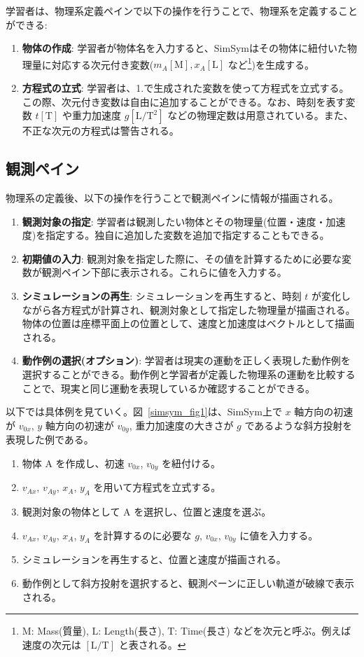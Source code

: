 \documentclass[11pt, a4paper, oneside, twocolumn, dvipdfmx]{jsarticle}
\newcommand{\simname}{SimSym}
\begin{document}
学習者は、物理系定義ペインで以下の操作を行うことで、物理系を定義することができる:

\begin{enumerate}
\item \textbf{物体の作成}: 学習者が物体名を入力すると、\simname はその物体に紐付いた物理量に対応する次元付き変数($m_A\mathrm{[M]}, x_A\mathrm{[L]}$ など\footnote{$\mathrm{M}$: Mass(質量), $\mathrm{L}$: Length(長さ), $\mathrm{T}$: Time(長さ) などを次元と呼ぶ。例えば速度の次元は $\mathrm{[L/T]}$ と表される。})を生成する。
\item \textbf{方程式の立式}: 学習者は、1.で生成された変数を使って方程式を立式する。この際、次元付き変数は自由に追加することができる。なお、時刻を表す変数 $t\mathrm{[T]}$ や重力加速度 $g\mathrm{[L/T^2]}$ などの物理定数は用意されている。また、不正な次元の方程式は警告される。
\end{enumerate}

\subsection*{観測ペイン}

物理系の定義後、以下の操作を行うことで観測ペインに情報が描画される。

\begin{enumerate}[resume]
\item \textbf{観測対象の指定}: 学習者は観測したい物体とその物理量(位置・速度・加速度)を指定する。独自に追加した変数を追加で指定することもできる。
\item \textbf{初期値の入力}: 観測対象を指定した際に、その値を計算するために必要な変数が観測ペイン下部に表示される。これらに値を入力する。
\item \textbf{シミュレーションの再生}: シミュレーションを再生すると、時刻 $t$ が変化しながら各方程式が計算され、観測対象として指定した物理量が描画される。物体の位置は座標平面上の位置として、速度と加速度はベクトルとして描画される。
\item \textbf{動作例の選択(オプション)}: 学習者は現実の運動を正しく表現した動作例を選択することができる。動作例と学習者が定義した物理系の運動を比較することで、現実と同じ運動を表現しているか確認することができる。
\end{enumerate}

以下では具体例を見ていく。図~\ref{simsym_fig1}は、\simname 上で $x$ 軸方向の初速が $v_{0x}$, $y$ 軸方向の初速が $v_{0y}$, 重力加速度の大きさが $g$ であるような斜方投射を表現した例である。
\begin{enumerate}
\item 物体 A を作成し、初速 $v_{0x}$, $v_{0y}$ を紐付ける。
\item $v_{Ax}$, $v_{Ay}$, $x_A$, $y_A$ を用いて方程式を立式する。
\item 観測対象の物体として A を選択し、位置と速度を選ぶ。
\item $v_{Ax}$, $v_{Ay}$, $x_A$, $y_A$ を計算するのに必要な $g$, $v_{0x}$, $v_{0y}$ に値を入力する。
\item シミュレーションを再生すると、位置と速度が描画される。
\item 動作例として斜方投射を選択すると、観測ペーンに正しい軌道が破線で表示される。
\end{enumerate}
\end{document}
